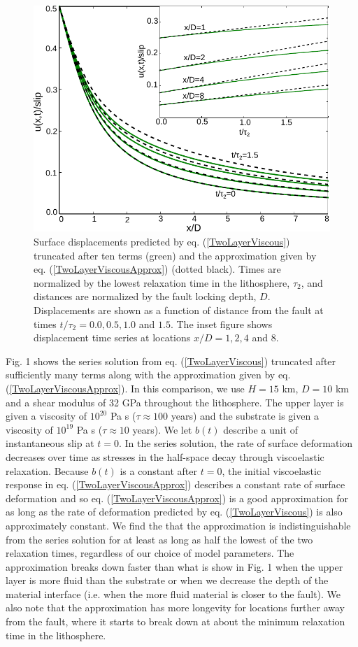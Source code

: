 \begin{figure}
\includegraphics{ch2/figures/Fig1.pdf}
\caption{Surface displacements predicted by eq.
(\ref{TwoLayerViscous}) truncated after ten terms (green) and the
approximation given by eq. (\ref{TwoLayerViscousApprox}) (dotted
black).  Times are normalized by the lowest relaxation time in the
lithosphere, $\tau_2$, and distances are normalized by the fault
locking depth, $D$.  Displacements are shown as a function of distance
from the fault at times $t/\tau_2 = 0.0,0.5,1.0$ and $1.5$. The inset
figure shows displacement time series at locations $x/D = 1, 2, 4$ and
$8$.}
\label{figure1}
\end{figure} 

Fig. 1 shows the series solution from eq. (\ref{TwoLayerViscous})
truncated after sufficiently many terms along with the approximation
given by eq. (\ref{TwoLayerViscousApprox}). In this comparison, we use
$H=15$ km, $D=10$ km and a shear modulus of 32 GPa throughout the
lithosphere.  The upper layer is given a viscosity of $10^{20}$ Pa s
($\tau\approx 100$ years) and the substrate is given a viscosity of
$10^{19}$ Pa s ($\tau\approx 10$ years).  We let $b(t)$ describe a
unit of instantaneous slip at $t=0$.  In the series solution, the
rate of surface deformation decreases over time as stresses in the
half-space decay through viscoelastic relaxation.  Because $b(t)$ is a
constant after $t=0$, the initial viscoelastic response in
eq. (\ref{TwoLayerViscousApprox}) describes a constant rate of surface
deformation and so eq. (\ref{TwoLayerViscousApprox}) is a good
approximation for as long as the rate of deformation predicted by
eq. (\ref{TwoLayerViscous}) is also approximately constant. We find
the that the approximation is indistinguishable from the series
solution for at least as long as half the lowest of the two relaxation
times, regardless of our choice of model parameters.  The
approximation breaks down faster than what is show in Fig. 1 when
the upper layer is more fluid than the substrate or when we decrease the
depth of the material interface (i.e. when the more fluid material is
closer to the fault).  We also note that the approximation has more
longevity for locations further away from the fault, where it starts
to break down at about the minimum relaxation time in the lithosphere.

